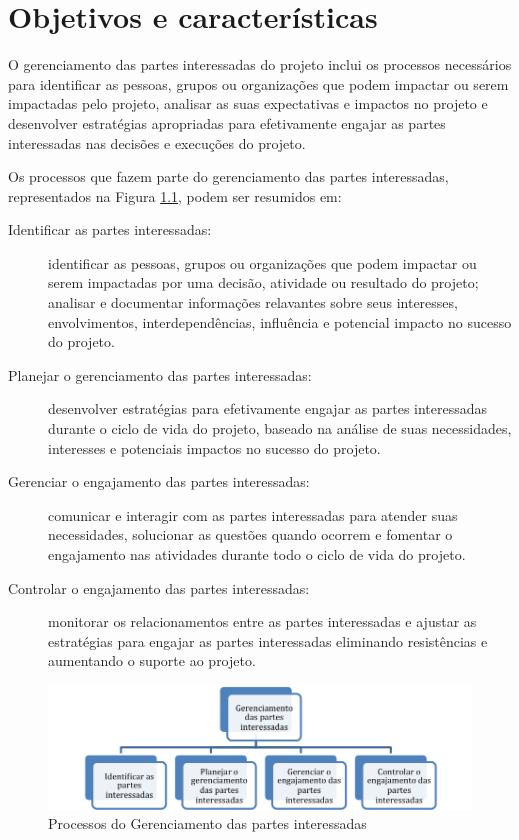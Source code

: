 \chapter{Objetivos e características}

O gerenciamento das partes interessadas do projeto inclui os processos necessários para identificar as pessoas, grupos ou organizações que podem impactar ou serem impactadas pelo projeto, analisar as suas expectativas e impactos no projeto e desenvolver estratégias apropriadas para efetivamente engajar as partes interessadas nas decisões e execuções do projeto.

Os processos que fazem parte do gerenciamento das partes interessadas, representados na Figura \ref{fig:proc:ger:stakeholders}, podem ser resumidos em:

\begin{description}

	\item[Identificar as partes interessadas:] identificar as pessoas, grupos ou organizações que podem impactar ou serem impactadas por uma decisão, atividade ou resultado do projeto; analisar e documentar informações relavantes sobre seus interesses, envolvimentos, interdependências, influência e potencial impacto no sucesso do projeto.
	
	\item[Planejar o gerenciamento das partes interessadas:] desenvolver estratégias para efetivamente engajar as partes interessadas durante o ciclo de vida do projeto, baseado na análise de suas necessidades, interesses e potenciais impactos no sucesso do projeto.
	
	\item[Gerenciar o engajamento das partes interessadas:] comunicar e interagir com as partes interessadas para atender suas necessidades, solucionar as questões quando ocorrem e fomentar o engajamento nas atividades durante todo o ciclo de vida do projeto.
	
	\item[Controlar o engajamento das partes interessadas:] monitorar os relacionamentos entre as partes interessadas e ajustar as estratégias para engajar as partes interessadas eliminando resistências e aumentando o suporte ao projeto.

\end{description}

\begin{figure}[!h]
	\centering
	\includegraphics[scale=0.75]{Figuras/gerenciamento_stakeholders.png}
	\caption{Processos do Gerenciamento das partes interessadas}
	\label{fig:proc:ger:stakeholders}
\end{figure}

